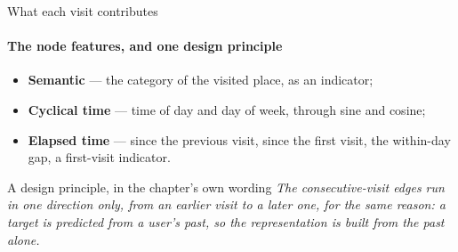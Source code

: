 \documentclass{beamer}
\begin{document}
\begin{frame}{What each visit contributes}
    \framesubtitle{The node features, and one design principle}

    \begin{itemize}
        \item \textbf{Semantic} --- the category of the visited place, as an indicator;
        \item \textbf{Cyclical time} --- time of day and day of week, through sine and cosine;
        \item \textbf{Elapsed time} --- since the previous visit, since the first visit,
              the within-day gap, a first-visit indicator.
    \end{itemize}

    \bigskip
    \begin{alertblock}{A design principle, in the chapter's own wording}
        \small
        \emph{The consecutive-visit edges run in one direction only, from an earlier visit to a
        later one, for the same reason: a target is predicted from a user's past, so the
        representation is built from the past alone.}
    \end{alertblock}
\end{frame}
\end{document}
